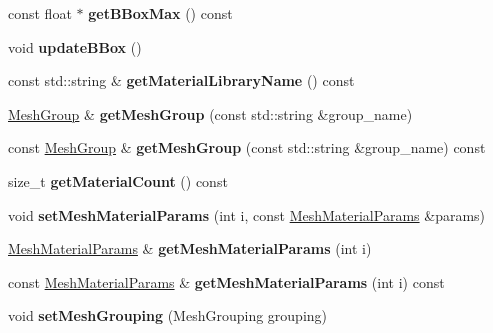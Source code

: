 \begin{DoxyCompactItemize}
\mbox{\label{class_mesh_base_a2523965279aad48d2ec9d1c6dad52dd6}} 
const float $\ast$ {\bfseries get\+B\+Box\+Max} () const
\item 
\mbox{\label{class_mesh_base_a3d1adf4bf4df703213bbffca0c11dc7e}} 
void {\bfseries update\+B\+Box} ()
\item 
\mbox{\label{class_mesh_base_a8f4908284b81877b9d2c228dd431fba9}} 
const std\+::string \& {\bfseries get\+Material\+Library\+Name} () const
\item 
\mbox{\label{class_mesh_base_a34a34bb6274bc30fbd6b2f604067a112}} 
\hyperlink{class_mesh_group}{Mesh\+Group} \& {\bfseries get\+Mesh\+Group} (const std\+::string \&group\+\_\+name)
\item 
\mbox{\label{class_mesh_base_a4388d065bac6275d4302129118a91270}} 
const \hyperlink{class_mesh_group}{Mesh\+Group} \& {\bfseries get\+Mesh\+Group} (const std\+::string \&group\+\_\+name) const
\item 
\mbox{\label{class_mesh_base_a886536a107777458b46f9542ec942f03}} 
size\+\_\+t {\bfseries get\+Material\+Count} () const
\item 
\mbox{\label{class_mesh_base_a12b8c0065ea9c86fcb6788dc86197dc0}} 
void {\bfseries set\+Mesh\+Material\+Params} (int i, const \hyperlink{class_mesh_material_params}{Mesh\+Material\+Params} \&params)
\item 
\mbox{\label{class_mesh_base_a49ce5e8227d6e83fcf2d38d71ae88300}} 
\hyperlink{class_mesh_material_params}{Mesh\+Material\+Params} \& {\bfseries get\+Mesh\+Material\+Params} (int i)
\item 
\mbox{\label{class_mesh_base_af8481fb32c036f76c336f7ac6b605820}} 
const \hyperlink{class_mesh_material_params}{Mesh\+Material\+Params} \& {\bfseries get\+Mesh\+Material\+Params} (int i) const
\item 
\mbox{\label{class_mesh_base_ad5332b0f81d76300422e37c2553a202a}} 
void {\bfseries set\+Mesh\+Grouping} (Mesh\+Grouping grouping)

\end{DoxyCompactItemize}
